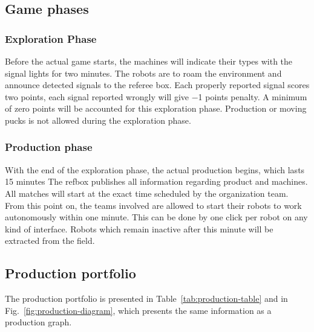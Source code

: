 \documentclass[12pt,twoside]{article}
\newcommand{\mytable}[1]{\savebox{\myt}{#1}\tikz\node[fill=gray!25!white]{\usebox{\myt}};}
\begin{document}
\subsection{Game phases} \label{sec:game-phases}
\subsubsection{Exploration Phase} \label{sec:expphase} 
%
Before the actual game starts, the machines will indicate their types
with the signal lights for two minutes. The robots are to roam the
environment and announce detected signals to the referee box. Each
properly reported signal scores two points, each signal reported
wrongly will give \num{-1} points penalty. A minimum of zero points
will be accounted for this exploration phase. Production or moving
pucks is not allowed during the exploration phase.


\subsubsection{Production phase}
\label{sec:production-phase}

With the end of the exploration phase, the actual production begins,
which lasts \num{15} minutes The refbox publishes all information
regarding product and machines. All matches will start at the exact time scheduled by the organization team.
From this point on, the teams involved are allowed to start their
 robots to work autonomously within one minute. This can be done by one
 click per robot on any kind of interface. Robots which remain inactive
 after this minute will be extracted from the field.


\subsection{Production portfolio} \label{sec:prodportfolio}

The production portfolio is presented in
Table~\ref{tab:production-table} and in
Fig.~\ref{fig:production-diagram}, which presents the same information
as a production graph.



\end{document}
